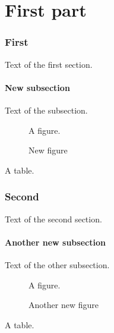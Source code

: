 \documentclass{article}
\begin{document}
\doparttoc
\dosecttoc
\dosectlof
\dosectlot
\tableofcontents
\listoffigures
\listoftables
\part{First part}
\parttoc
\section{First}
\secttoc
\sectlof
\sectlot
Text of the first section.
\subsection{New subsection}
Text of the subsection.
\begin{figure}[h]
\centering A figure.
\caption{New figure}
\end{figure}
\begin{table}[h]
\centering A table.
\caption{New table}
\end{table}
\section{Second}
\secttoc
\sectlof
\sectlot
Text of the second section.
\subsection{Another new subsection}
Text of the other subsection.
\begin{figure}[h]
\centering A figure.
\caption{Another new figure}
\end{figure}
\begin{table}[h]
\centering A table.
\caption{Another new table}
\end{table}
\end{document}
